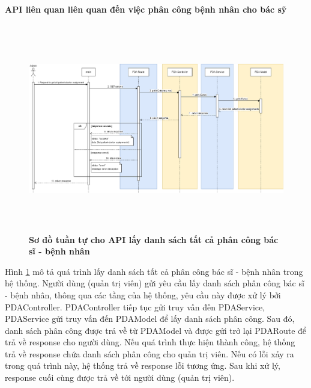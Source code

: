 
\paragraph{API liên quan liên quan đến việc phân công bệnh nhân cho bác sỹ}
\mbox{}


\begin{figure}[H]
  \centering
  \includegraphics[width=16cm,height=9cm]{Images/sequence_api/getAllPDA.png}
  \caption[Sơ đồ tuần tự cho API lấy danh sách tất cả phân công bác sĩ - bệnh nhân ]{\bfseries \fontsize{12pt}{0pt}
  \selectfont Sơ đồ tuần tự cho API lấy danh sách tất cả phân công bác sĩ - bệnh nhân }
  \label{getAllPDA} %
\end{figure}
Hình \ref{getAllPDA} mô tả quá trình lấy danh sách tất cả phân công bác sĩ - bệnh nhân trong hệ thống. Người dùng (quản trị viên) gửi yêu cầu lấy danh sách phân công bác sĩ - bệnh nhân, thông qua các tầng của hệ thống, 
yêu cầu này được xử lý bởi PDAController. PDAController tiếp tục gửi truy vấn đến PDAService, PDAService gửi truy vấn đến PDAModel để lấy danh sách phân công. Sau đó, danh sách phân công được trả về từ PDAModel và được gửi trở lại PDARoute
 để trả về response cho người dùng. Nếu quá trình thực hiện thành công, hệ thống trả về response chứa danh sách phân công cho quản trị viên. Nếu có lỗi xảy ra trong quá trình này, hệ thống trả về response lỗi tương ứng. Sau khi xử lý, response cuối cùng được 
trả về tới người dùng (quản trị viên).

